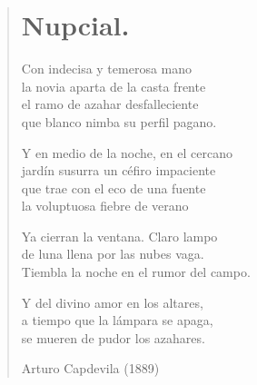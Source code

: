 \documentclass[12pt, twoside]{book}
\begin{document}
\begin{verse}
\begin{center}
\section{Nupcial.}
\end{center}
Con indecisa y temerosa mano\\
la novia aparta de la casta frente\\
el ramo de azahar desfalleciente\\
que blanco nimba su perfil pagano.\newline

Y en medio de la noche, en el cercano\\
jardín susurra un céfiro impaciente\\
que trae con el eco de una fuente\\
la voluptuosa fiebre de verano\newline

Ya cierran la ventana. Claro lampo\\
de luna llena por las nubes vaga.\\
Tiembla la noche en el rumor del campo.\newline

Y del divino amor en los altares,\\
a tiempo que la lámpara se apaga,\\
se mueren de pudor los azahares.\newline

Arturo Capdevila (1889)

\end{verse}
\newpage
\end{document}
